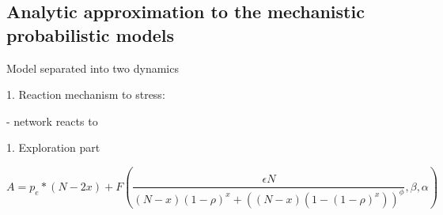 \subsection{Analytic approximation to the mechanistic probabilistic models}

Model separated into two dynamics

1. Reaction mechanism to stress:

- network reacts to

1. Exploration part

\begin{equation}
  A = p_e * (N - 2 x) + F(\frac{\epsilon N}{(N - x) (1 - \rho)^{x} + ((N - x) (1 - (1 - \rho)^{x}))^\phi}, \beta, \alpha)
\end{equation}
